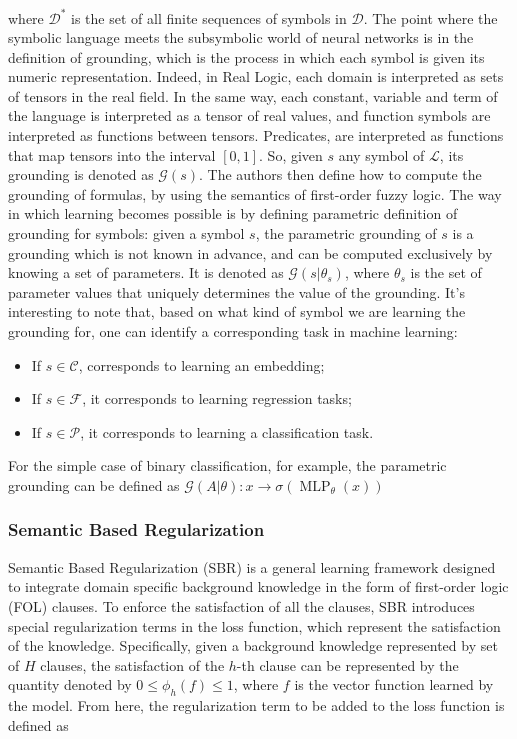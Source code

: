  where $\mathcal{D^*}$ is the set of all finite sequences of symbols in $\mathcal{D}$.
 The point where the symbolic language meets the subsymbolic world of neural networks is in the definition of grounding, which is the process in which each symbol is given its numeric representation. Indeed, in Real Logic, each domain is interpreted as sets of tensors in the real field. In the same way, each constant, variable and term of the language is interpreted as a tensor of real values, and function symbols are interpreted as functions between tensors. Predicates, are interpreted as functions that map tensors into the interval $[0,1]$. So, given $s$ any symbol of $\mathcal{L}$, its grounding is denoted as $\mathcal{G}(s)$. 
 The authors then define how to compute the grounding of formulas, by using the semantics of first-order fuzzy logic. 
 The way in which learning becomes possible is by defining parametric definition of grounding for symbols: given a symbol $s$, the parametric grounding of $s$ is a grounding which is not known in advance, and can be computed exclusively by knowing a set of parameters. It is denoted as $\mathcal{G}(s|\theta_s)$, where $\theta_s$ is the set of parameter values that uniquely determines the value of the grounding. It's interesting to note that, based on what kind of symbol we are learning the grounding for, one can identify a corresponding task in machine learning:
 \begin{itemize}
 	\item If $s \in \mathcal{C}$, corresponds to learning an embedding;
 	\item If $s \in \mathcal{F}$, it corresponds to learning regression tasks;
 	\item If $s \in \mathcal{P}$, it corresponds to learning a classification task.
 \end{itemize}

For the simple case of binary classification, for example, the parametric grounding can be defined as $\mathcal{G}(A|\theta):x \rightarrow \sigma(\operatorname{MLP}_{\theta}(x))$
 
 \subsubsection{Semantic Based Regularization}
 Semantic Based Regularization (SBR) is a general learning framework designed to integrate domain specific background knowledge in the form of first-order logic (FOL) clauses. To enforce the satisfaction of all the clauses, SBR introduces special regularization terms in the loss function, which represent the satisfaction of the knowledge. Specifically, given a background knowledge represented by set of $H$ clauses, the satisfaction of the $h$-th clause can be represented by the quantity denoted by $0 \leq \phi_h(f) \leq 1$, where $f$ is the vector function learned by the model. From here, the regularization term to be added to the loss function is defined as
 
